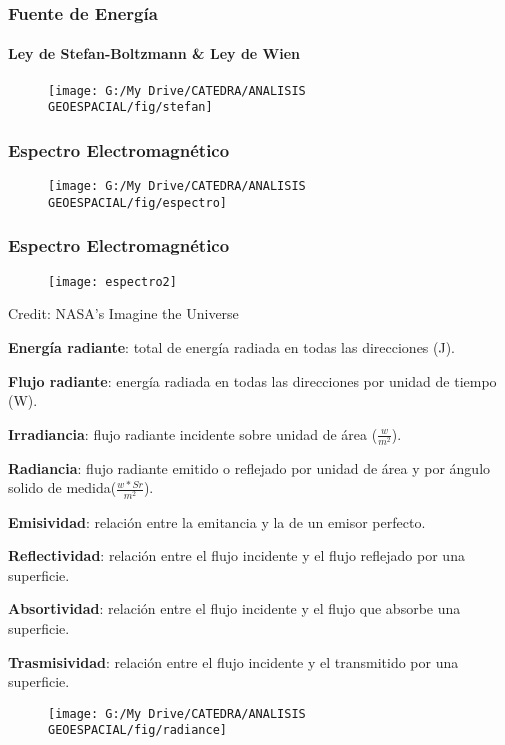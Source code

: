 \documentclass[14pt]{beamer}
\begin{document}
\begin{frame}
\frametitle{Fuente de Energía}
\framesubtitle{Ley de Stefan-Boltzmann \& Ley de Wien}
  \begin{figure}
    \centering
    \texttt{[image: G:/My Drive/CATEDRA/ANALISIS GEOESPACIAL/fig/stefan]}
  \end{figure}
\end{frame}
\begin{frame}
\frametitle{Espectro Electromagnético}
  \begin{figure}
    \centering
    \texttt{[image: G:/My Drive/CATEDRA/ANALISIS GEOESPACIAL/fig/espectro]}
  \end{figure}
\end{frame}
\begin{frame}
\frametitle{Espectro Electromagnético}
  \begin{figure}
    \centering
    \texttt{[image: espectro2]}
  \end{figure}
\tiny{Credit: NASA's Imagine the Universe}
\end{frame}
\begin{frame}
\begin{itemize}
\scriptsize{
\item \textbf{Energía radiante}: total de energía radiada en todas las direcciones (J).
\item \textbf{Flujo radiante}: energía radiada en todas las direcciones por unidad de tiempo (W).
\item \textbf{Irradiancia}: flujo radiante incidente sobre unidad de área ($\frac{w}{m^2}$).
\item \textbf{Radiancia}: flujo radiante emitido o reflejado por unidad de área y por ángulo solido de medida($\frac{w*Sr}{m^2}$).
\item \textbf{Emisividad}: relación entre la emitancia y la de un emisor perfecto.
\item \textbf{Reflectividad}: relación entre el flujo incidente y el flujo reflejado por una superficie.
\item \textbf{Absortividad}: relación entre el flujo incidente y el flujo que absorbe una superficie.
\item \textbf{Trasmisividad}: relación entre el flujo incidente y el transmitido por una superficie.
}
 \begin{figure}
    \centering
    \texttt{[image: G:/My Drive/CATEDRA/ANALISIS GEOESPACIAL/fig/radiance]}
  \end{figure}
\end{itemize}
\end{frame}
\end{document}
